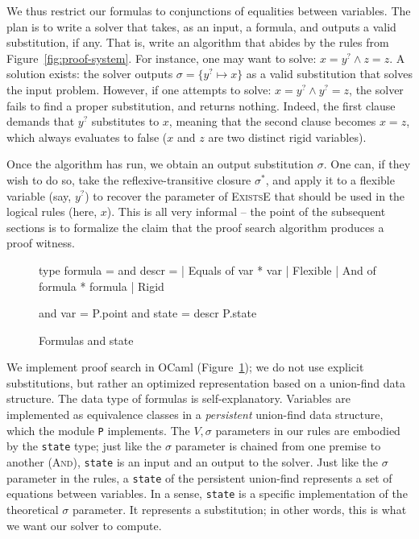 \documentclass{easychair}
\def\li{\lstinline}
\let\Rule\textsc
\newcommand{\fref}[1]{Figure~\ref{fig:#1}}
\newcommand{\f}[1]{\ensuremath{#1^?}} %
\begin{document}
We thus restrict our formulas to conjunctions of equalities between variables.
The plan is to write a solver that takes,
as an input, a formula, and outputs a valid substitution, if any. That is,
write an algorithm that abides by the rules from \fref{proof-system}.
For instance, one may want to solve: $x = \f y \wedge z = z$.
A solution exists: the solver outputs $\sigma = \{ \f y \mapsto x \}$ as a valid
substitution that solves the input problem. However, if one attempts to solve:
$x = \f y \wedge \f y = z$, the solver fails to find a
proper substitution, and returns nothing. Indeed, the first clause demands that
$\f y$ substitutes to $x$, meaning that the second clause becomes $x = z$, which
always evaluates to false ($x$ and $z$ are two distinct rigid variables).

Once the algorithm has run, we obtain an output substitution $\sigma$. One can, if they
wish to do so, take the reflexive-transitive closure $\sigma^*$, and apply it to
a flexible variable (say, $\f y$) to recover the parameter of \Rule{ExistsE}
that should be used in the logical rules (here, $x$). This is all very informal
-- the point of the subsequent sections is to formalize the claim that the proof
search algorithm produces a proof witness.

\begin{figure}
  \centering
  \begin{ocaml}
type formula =                and descr =
| Equals of var * var           | Flexible
| And of formula * formula      | Rigid

and var = P.point             and state = descr P.state
  \end{ocaml}
  \caption{Formulas and state}
  \label{fig:formulas}
\end{figure}

We implement proof search in OCaml (\fref{formulas}); we do not use explicit
substitutions, but rather an optimized representation based on a union-find data
structure. The data type of formulas
is self-explanatory. Variables are implemented as equivalence classes in a
\emph{persistent} union-find data structure, which the module \li+P+ implements.
The $V, \sigma$ parameters in our rules are embodied by the \li+state+ type; just
like the $\sigma$ parameter is chained from one premise to another (\Rule{And}),
\li+state+ is an input and an output to the solver. Just like the $\sigma$ parameter
in the rules, a \li+state+ of the persistent union-find represents
a set of equations between variables. In a sense, \li+state+ is a specific
implementation of the theoretical $\sigma$ parameter. It represents a
substitution; in other words, this is what we want our solver to compute.
\end{document}
